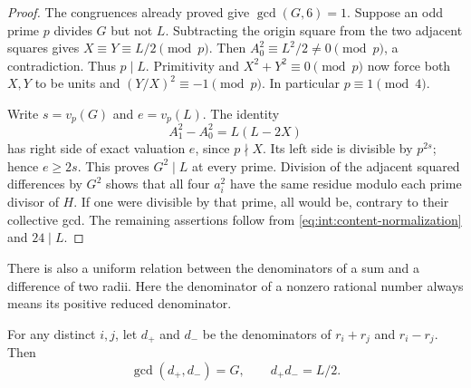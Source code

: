 \begin{proof}
The congruences already proved give $\gcd(G,6)=1$. Suppose an odd
prime $p$ divides $G$ but not $L$. Subtracting the origin square from
the two adjacent squares gives $X\equiv Y\equiv L/2\pmod p$.
Then $A_0^2\equiv L^2/2\ne0\pmod p$, a contradiction. Thus
$p\mid L$. Primitivity and $X^2+Y^2\equiv0\pmod p$ now force both
$X,Y$ to be units and $(Y/X)^2\equiv-1\pmod p$. In particular
$p\equiv1\pmod4$.

Write $s=v_p(G)$ and $e=v_p(L)$. The identity
\[
 A_1^2-A_0^2=L(L-2X)
\]
has right side of exact valuation $e$, since $p\nmid X$. Its left
side is divisible by $p^{2s}$; hence $e\ge2s$. This proves
$G^2\mid L$ at every prime. Division of the adjacent squared
differences by $G^2$ shows that all four $a_i^2$ have the same residue
modulo each prime divisor of $H$. If one were divisible by that prime,
all would be, contrary to their collective gcd. The remaining
assertions follow from \eqref{eq:int:content-normalization} and
$24\mid L$.
\end{proof}

There is also a uniform relation between the denominators of a sum
and a difference of two radii. Here the denominator of a nonzero
rational number always means its positive reduced denominator.

\begin{theorem}\label{thm:int:pair-denominators}
For any distinct $i,j$, let $d_+$ and $d_-$ be the denominators of
$r_i+r_j$ and $r_i-r_j$. Then
\begin{equation}\label{eq:int:denominator-product}
 \gcd(d_+,d_-)=G,\qquad d_+d_-=L/2.
\end{equation}
\end{theorem}

